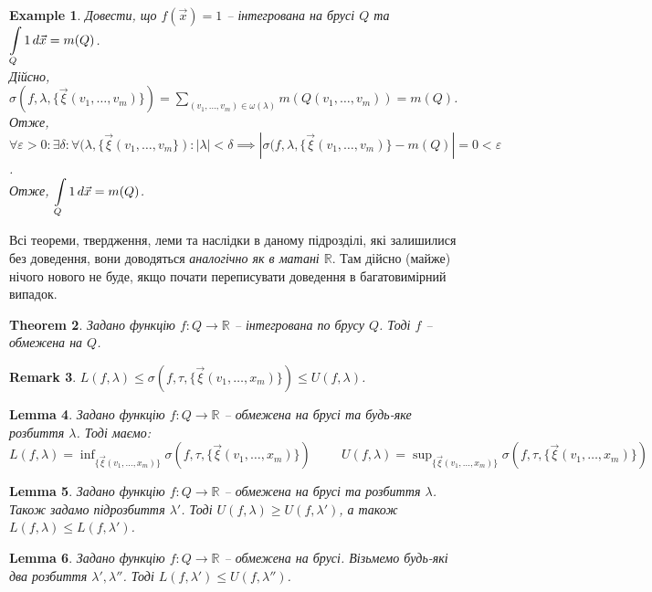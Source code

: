 \documentclass[a4paper, 10pt]{article}
\theoremstyle{theoremdd}
\newtheorem{theorem}{Theorem}[subsection]
\theoremstyle{theoremdd}
\theoremstyle{theoremdd}
\theoremstyle{theoremdd}
\theoremstyle{theoremdd}
\newtheorem{example}[theorem]{Example}
\theoremstyle{theoremdd}
\theoremstyle{theoremdd}
\theoremstyle{theoremdd}
\theoremstyle{theoremdd}
\theoremstyle{theoremdd}
\theoremstyle{theoremdd}
\newtheorem{remark}[theorem]{Remark}
\theoremstyle{theoremdd}
\theoremstyle{theoremdd}
\newtheorem{lemma}[theorem]{Lemma}
\theoremstyle{theoremdd}
\theoremstyle{theoremdd}
\begin{document}
\begin{example}
Довести, що $f(\vec{x}) = 1$ -- інтегрована на брусі $Q$ та $\displaystyle\int\displaylimits_Q 1\,d\vec{x} = m(Q)$.\\
Дійсно, $\displaystyle\sigma(f,\lambda,\{\vec{\xi}(v_1,\dots,v_m) \}) = \sum_{(v_1,\dots,v_m) \in \omega(\lambda)} m(Q(v_1,\dots,v_m)) = m(Q)$.\\
Отже, $\forall \varepsilon > 0: \exists \delta: \forall (\lambda, \{ \vec{\xi}(v_1,\dots,v_m \}): |\lambda| < \delta \implies |\sigma(f,\lambda,\{ \vec{\xi}(v_1,\dots,v_m) \} - m(Q)| = 0 < \varepsilon$.\\
Отже, $\displaystyle\int\displaylimits_Q 1\,d\vec{x} = m(Q)$.
\end{example}

Всі теореми, твердження, леми та наслідки в даному підрозділі, які залишилися без доведення, вони доводяться \textit{аналогічно як в матані $\mathbb{R}$}. Там дійсно (майже) нічого нового не буде, якщо почати переписувати доведення в багатовимірний випадок.

\begin{theorem}
Задано функцію $f \colon Q \to \mathbb{R}$ -- інтегрована по брусу $Q$. Тоді $f$ -- обмежена на $Q$.
\end{theorem}

\begin{remark}
$L(f,\lambda) \leq \sigma(f,\tau,\{ \vec{\xi}(v_1,\dots,x_m) \}) \leq U(f,\lambda)$.
\end{remark}

\begin{lemma}
Задано функцію $f \colon Q \to \mathbb{R}$ -- обмежена на брусі та будь-яке розбиття $\lambda$. Тоді маємо:\\
$L(f,\lambda) = \displaystyle\inf_{\{ \vec{\xi}(v_1,\dots,x_m) \}} \sigma(f,\tau,\{ \vec{\xi}(v_1,\dots,x_m) \}) \hspace{1cm} U(f,\lambda) = \displaystyle\sup_{\{ \vec{\xi}(v_1,\dots,x_m) \}} \sigma(f,\tau,\{ \vec{\xi}(v_1,\dots,x_m) \})$
\end{lemma}

\begin{lemma}
Задано функцію $f \colon Q \to \mathbb{R}$ -- обмежена на брусі та розбиття $\lambda$. Також задамо підрозбиття $\lambda'$. Тоді $U(f,\lambda) \geq U(f,\lambda')$, а також $L(f,\lambda) \leq L(f,\lambda')$.
\end{lemma}

\begin{lemma}
Задано функцію $f \colon Q \to \mathbb{R}$ -- обмежена на брусі. Візьмемо будь-які два розбиття $\lambda', \lambda''$. Тоді $L(f,\lambda') \leq U(f,\lambda'')$.
\end{lemma}
\end{document}
